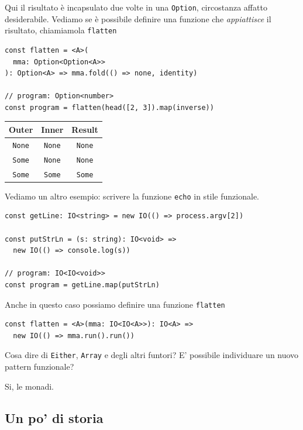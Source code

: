 \documentclass[12pt]{article}
\begin{document}
Qui il risultato è incapsulato due volte in una \texttt{Option}, circostanza affatto desiderabile.
Vediamo se è possibile definire una funzione che \emph{appiattisce} il risultato, chiamiamola \texttt{flatten}

\begin{verbatim}
const flatten = <A>(
  mma: Option<Option<A>>
): Option<A> => mma.fold(() => none, identity)

// program: Option<number>
const program = flatten(head([2, 3]).map(inverse))
\end{verbatim}

\begin{center}
\begin{tabular}{ c c c }
 Outer & Inner & Result \\
 \hline
 \texttt{None} & \texttt{None} & \texttt{None} \\
 \texttt{Some} & \texttt{None} & \texttt{None} \\
 \texttt{Some} & \texttt{Some} & \texttt{Some}
\end{tabular}
\end{center}

Vediamo un altro esempio: scrivere la funzione \texttt{echo} in stile funzionale.

\begin{verbatim}
const getLine: IO<string> = new IO(() => process.argv[2])

const putStrLn = (s: string): IO<void> =>
  new IO(() => console.log(s))

// program: IO<IO<void>>
const program = getLine.map(putStrLn)
\end{verbatim}

Anche in questo caso possiamo definire una funzione \texttt{flatten}

\begin{verbatim}
const flatten = <A>(mma: IO<IO<A>>): IO<A> =>
  new IO(() => mma.run().run())
\end{verbatim}

Cosa dire di \texttt{Either}, \texttt{Array} e degli altri funtori?
E' possibile individuare un nuovo pattern funzionale?

Si, le monadi.

\subsection{Un po' di storia}
\end{document}
